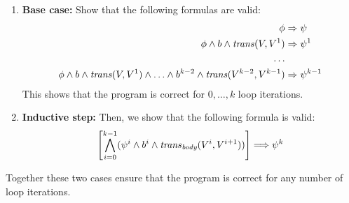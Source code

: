 \documentclass{amsart}
\theoremstyle{definition}
\theoremstyle{remark}
\numberwithin{equation}{section}
\begin{document}
\begin{enumerate}
  \item \textbf{Base case:}
  Show that the following formulas are valid:
  \begin{align*}
    \phi &\Rightarrow \psi\\
    \phi \land b \land \mathit{trans}(V,V^1) &\Rightarrow \psi^1\\
    \ldots\\
    \phi \land b \land \mathit{trans}(V,V^1) \land \ldots \land b^{k-2} \land \mathit{trans}(V^{k-2}, V^{k-1}) &\Rightarrow \psi^{k-1}
  \end{align*}
  This shows that the program is correct for $0,\ldots,k$
  loop iterations.

  \item \textbf{Inductive step:}
  Then, we show that the following formula is valid:
  \begin{align*}
    \left[\bigwedge_{i=0}^{k-1}(
    \psi^{i} \land b^i \land  \mathit{trans}_{\emph{body}}(V^i,V^{i+1}))
    \right] \Longrightarrow \psi^k
  \end{align*}
\end{enumerate}
Together these two cases ensure that the program
is correct for any number of loop iterations.
\end{document}
